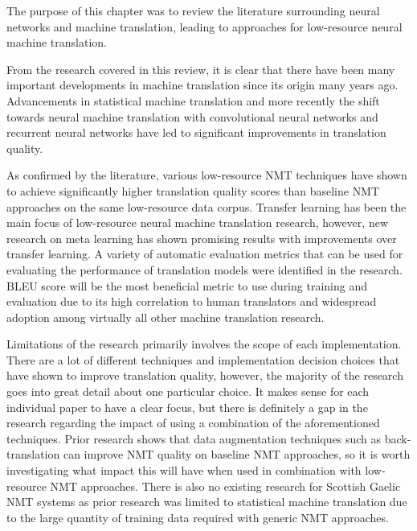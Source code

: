 The purpose of this chapter was to review the literature surrounding neural networks and machine translation, leading to approaches for low-resource neural machine translation. 

From the research covered in this review, it is clear that there have been many important developments in machine translation since its origin many years ago. Advancements in statistical machine translation and more recently the shift towards neural machine translation with convolutional neural networks and recurrent neural networks have led to significant improvements in translation quality.

As confirmed by the literature, various low-resource \acrshort{NMT} techniques have shown to achieve significantly higher translation quality scores than baseline \acrshort{NMT} approaches on the same low-resource data corpus. Transfer learning has been the main focus of low-resource neural machine translation research, however, new research on meta learning has shown promising results with improvements over transfer learning. A variety of automatic evaluation metrics that can be used for evaluating the performance of translation models were identified in the research. \acrshort{BLEU} score will be the most beneficial metric to use during training and evaluation due to its high correlation to human translators and widespread adoption among virtually all other machine translation research.

Limitations of the research primarily involves the scope of each implementation. There are a lot of different techniques and implementation decision choices that have shown to improve translation quality, however, the majority of the research goes into great detail about one particular choice. It makes sense for each individual paper to have a clear focus, but there is definitely a gap in the research regarding the impact of using a combination of the aforementioned techniques. Prior research shows that data augmentation techniques such as back-translation can improve \acrshort{NMT} quality on baseline \acrshort{NMT} approaches, so it is worth investigating what impact this will have when used in combination with low-resource \acrshort{NMT} approaches. There is also no existing research for Scottish Gaelic \acrshort{NMT} systems as prior research was limited to statistical machine translation due to the large quantity of training data required with generic \acrshort{NMT} approaches.





